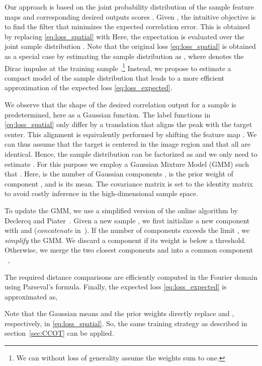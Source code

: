 \documentclass[10pt,twocolumn,letterpaper]{article}
\begin{document}
Our approach is based on the joint probability distribution  of the sample feature maps  and corresponding desired outputs scores . Given , the intuitive objective is to find the filter that minimizes the expected correlation error. This is obtained by replacing \eqref{eq:loss_spatial} with
Here, the expectation  is evaluated over the joint sample distribution . Note that the original loss \eqref{eq:loss_spatial} is obtained as a special case by estimating the sample distribution as , where  denotes the Dirac impulse at the training sample .\footnote{We can without loss of generality assume the weights  sum to one.} 
Instead, we propose to estimate a compact model of the sample distribution  that leads to a more efficient approximation of the expected loss \eqref{eq:loss_expected}.

We observe that the shape of the desired correlation output  for a sample  is predetermined, here as a Gaussian function. The label functions  in \eqref{eq:loss_spatial} only differ by a translation that aligns the peak with the target center. This alignment is equivalently performed by shifting the feature map . We can thus assume that the target is centered in the image region and that all  are identical. 
Hence, the sample distribution can be factorized as  and we only need to estimate .
For this purpose we employ a Gaussian Mixture Model (GMM) 
such that . Here,  is the number of Gaussian components ,  is the prior weight of component , and  is its mean. The covariance matrix is set to the identity matrix  to avoid costly inference in the high-dimensional sample space.

To update the GMM, we use a simplified version of the online algorithm by Declercq and Piater~\cite{Declercq2008}. Given a new sample , we first initialize a new component  with  and  (\emph{concatenate} in~\cite{Declercq2008}). If the number of components exceeds the limit , we \emph{simplify} the GMM.  We discard a component if its weight  is below a threshold. Otherwise, we merge the two closest components  and  into a common component ~\cite{Declercq2008},

The required distance comparisons  are efficiently computed in the Fourier domain using Parseval's formula. Finally, the expected loss \eqref{eq:loss_expected} is approximated as,

Note that the Gaussian means  and the prior weights  directly replace  and , respectively, in \eqref{eq:loss_spatial}. So, the same training strategy as described in section~\ref{sec:CCOT} can be applied.
\end{document}
